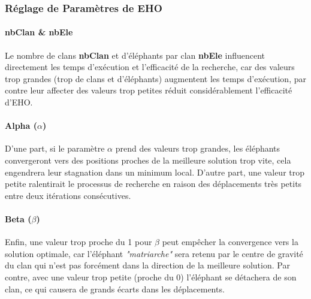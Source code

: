 	\vspace{-0.3cm}
	\subsubsection{Réglage de Paramètres de EHO}
	
	\paragraph{nbClan \& nbEle}
	Le nombre de clans \textbf{nbClan} et d'éléphants par clan \textbf{nbEle} influencent directement les temps d'exécution et l'efficacité de la recherche, car des valeurs trop grandes (trop de clans et d'éléphants) augmentent les temps d'exécution, par contre leur affecter des valeurs trop petites réduit considérablement l'efficacité d'EHO.
	
	\paragraph{Alpha ($\alpha$)} D'une part, si le paramètre $\alpha$ prend des valeurs trop grandes, les éléphants convergeront vers des positions proches de la meilleure solution trop vite, cela engendrera leur stagnation dans un minimum local. D'autre part, une valeur trop petite ralentirait le processus de recherche en raison des déplacements très petits entre deux itérations consécutives.
	
	\paragraph{Beta ($\beta$)} Enfin, une valeur trop proche du 1 pour $\beta$ peut empêcher la convergence vers la solution optimale, car l'éléphant \textit{"matriarche"} sera retenu par le centre de gravité du clan qui n'est pas forcément dans la direction de la meilleure solution. Par contre, avec une valeur trop petite (proche du 0) l'éléphant se détachera de son clan, ce qui causera de grands écarts dans les déplacements.\\
	
